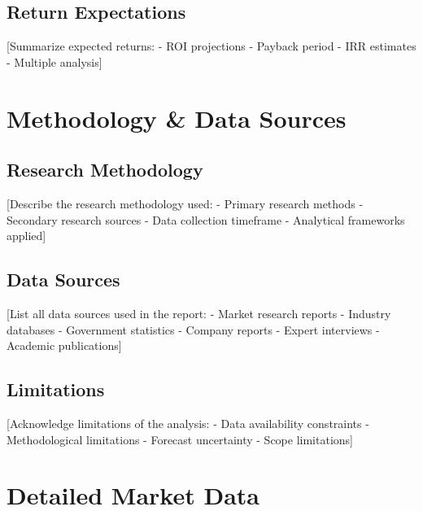 \documentclass[11pt,letterpaper]{report}
\begin{document}
\section{Return Expectations}

[Summarize expected returns:
- ROI projections
- Payback period
- IRR estimates
- Multiple analysis]

\appendix

\chapter{Methodology \& Data Sources}

\section{Research Methodology}

[Describe the research methodology used:
- Primary research methods
- Secondary research sources
- Data collection timeframe
- Analytical frameworks applied]

\section{Data Sources}

[List all data sources used in the report:
- Market research reports
- Industry databases
- Government statistics
- Company reports
- Expert interviews
- Academic publications]

\section{Limitations}

[Acknowledge limitations of the analysis:
- Data availability constraints
- Methodological limitations
- Forecast uncertainty
- Scope limitations]

\chapter{Detailed Market Data}
\end{document}
